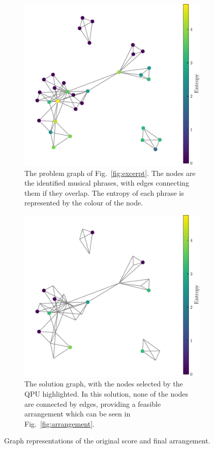 \documentclass[aps,pra,12pt,onecolumn]{revtex4-2}
\begin{document}
\begin{figure}[h]
    \centering
    \begin{subfigure}[b]{0.5\linewidth}
        \includegraphics[width=0.9\linewidth]{../Figures/problemGraph.pdf}
        \caption{The problem graph of Fig.\ \ref{fig:excerpt}. The nodes are the identified musical phrases, with edges connecting them if they overlap. The entropy of each phrase is represented by the colour of the node.}
        \label{fig:problem-graph}
    \end{subfigure}\hfill
    \begin{subfigure}[b]{0.5\linewidth}
        \includegraphics[width=0.9\linewidth]{../Figures/solutionGraph.pdf}
        \caption{The solution graph, with the nodes selected by the QPU highlighted. In this solution, none of the nodes are connected by edges, providing a feasible arrangement which can be seen in Fig.\ \ref{fig:arrangement}.}
        \label{fig:solution-graph}
    \end{subfigure}
    \caption{Graph representations of the original score and final arrangement.}
    \label{fig:graphs}
\end{figure}
\end{document}
